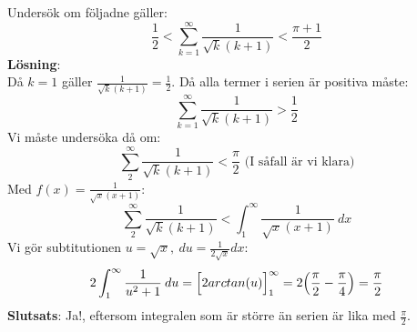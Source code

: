 \documentclass{report}
\begin{document}
\ex{}
{
Undersök om följadne gäller:
\begin{equation*}
\frac{1}{2} < \sum_{k=1}^{ \infty} \frac{1}{ \sqrt{k} (k+1)} < \frac{\pi+1}{2}    
\end{equation*}
\textbf{Lösning}:\\
Då $ k = 1 $ gäller $ \frac{1}{ \sqrt{k} (k+1)} = \frac{1}{2}  $. Då alla termer i serien är positiva måste:
\begin{equation*}
\sum_{k = 1}^{ \infty} \frac{1}{ \sqrt{k} (k+1)} > \frac{1}{2} 
\end{equation*}
Vi måste undersöka då om:
\begin{equation*}
	\sum_{2}^{ \infty} \frac{1}{ \sqrt{k} (k+1)} < \frac{\pi}{2} \text{ (I såfall är vi klara)}  
\end{equation*}
Med $ f(x) = \frac{1}{ \sqrt{x} (x+1)}$:
\begin{equation*}
\sum_{2}^{ \infty} \frac{1}{ \sqrt{k} (k+1)} < \int_{1}^{ \infty} \frac{1}{ \sqrt{x}(x+1)}  \: dx 
\end{equation*}
Vi gör subtitutionen $ u = \sqrt{x}, \: du = \frac{1}{2 \sqrt{x} } dx $:
\begin{equation*}
	2\int_{1}^{ \infty} \frac{1}{u^2+1}  \: du = \Bigl[ 2 arctan(u)  \Bigr]_{1}^{ \infty } = 2\Bigl( \frac{\pi}{2} - \frac{\pi}{4}   \Bigr) = \frac{\pi}{2} 
\end{equation*}
\textbf{Slutsats}: Ja!, eftersom integralen som är större än serien är lika med $ \frac{\pi}{2}  $.
}
\end{document}
